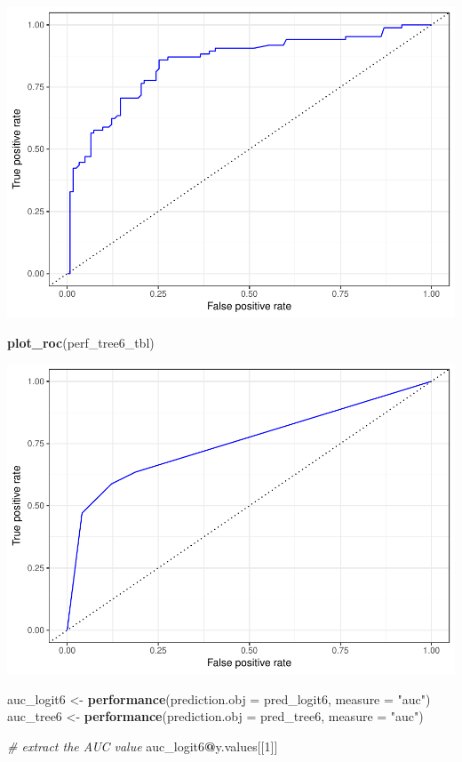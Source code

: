 \documentclass[]{article}
\newenvironment{Shaded}{\begin{snugshade}}{\end{snugshade}}
\newcommand{\KeywordTok}[1]{\textcolor[rgb]{0.13,0.29,0.53}{\textbf{#1}}}
\newcommand{\DataTypeTok}[1]{\textcolor[rgb]{0.13,0.29,0.53}{#1}}
\newcommand{\DecValTok}[1]{\textcolor[rgb]{0.00,0.00,0.81}{#1}}
\newcommand{\StringTok}[1]{\textcolor[rgb]{0.31,0.60,0.02}{#1}}
\newcommand{\CommentTok}[1]{\textcolor[rgb]{0.56,0.35,0.01}{\textit{#1}}}
\newcommand{\OperatorTok}[1]{\textcolor[rgb]{0.81,0.36,0.00}{\textbf{#1}}}
\newcommand{\NormalTok}[1]{#1}
\begin{document}
\includegraphics{homework_8_Hee_Bryan_files/figure-latex/unnamed-chunk-4-2.pdf}

\begin{Shaded}
\begin{Highlighting}[]
\KeywordTok{plot_roc}\NormalTok{(perf_tree6_tbl)}
\end{Highlighting}
\end{Shaded}

\includegraphics{homework_8_Hee_Bryan_files/figure-latex/unnamed-chunk-4-3.pdf}

\begin{Shaded}
\begin{Highlighting}[]
\NormalTok{auc_logit6 <-}\StringTok{ }\KeywordTok{performance}\NormalTok{(}\DataTypeTok{prediction.obj =}\NormalTok{ pred_logit6, }\DataTypeTok{measure =} \StringTok{"auc"}\NormalTok{)}
\NormalTok{auc_tree6 <-}\StringTok{ }\KeywordTok{performance}\NormalTok{(}\DataTypeTok{prediction.obj =}\NormalTok{ pred_tree6, }\DataTypeTok{measure =} \StringTok{"auc"}\NormalTok{)}

\CommentTok{# extract the AUC value}
\NormalTok{auc_logit6}\OperatorTok{@}\NormalTok{y.values[[}\DecValTok{1}\NormalTok{]]}
\end{Highlighting}
\end{Shaded}
\end{document}
